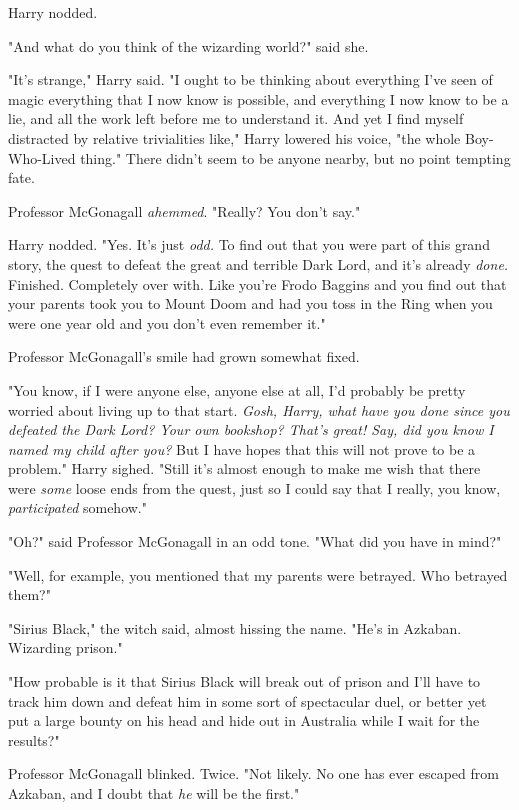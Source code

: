 Harry nodded.

"And what do you think of the wizarding world?" said she.

"It's strange," Harry said. "I ought to be thinking about everything I've seen
of magic{\el} everything that I now know is possible, and everything I now
know to be a lie, and all the work left before me to understand it. And yet I
find myself distracted by relative trivialities like," Harry lowered his voice,
"the whole Boy-Who-Lived thing." There didn't seem to be anyone nearby, but no
point tempting fate.

Professor McGonagall \emph{ahemmed}. "Really? You don't say."

Harry nodded. "Yes. It's just{\el} \emph{odd.} To find out that you were
part of this grand story, the quest to defeat the great and terrible Dark Lord,
and it's already \emph{done.} Finished. Completely over with. Like you're Frodo
Baggins and you find out that your parents took you to Mount Doom and had you
toss in the Ring when you were one year old and you don't even remember it."

Professor McGonagall's smile had grown somewhat fixed.

"You know, if I were anyone else, anyone else at all, I'd probably be pretty
worried about living up to that start. \emph{Gosh, Harry, what have you done
since you defeated the Dark Lord? Your own bookshop? That's great! Say, did you
know I named my child after you?} But I have hopes that this will not prove to
be a problem." Harry sighed. "Still{\el} it's almost enough to make me wish
that there were \emph{some} loose ends from the quest, just so I could say that
I really, you know, \emph{participated} somehow."

"Oh?" said Professor McGonagall in an odd tone. "What did you have in mind?"

"Well, for example, you mentioned that my parents were betrayed. Who betrayed
them?"

"Sirius Black," the witch said, almost hissing the name. "He's in Azkaban.
Wizarding prison."

"How probable is it that Sirius Black will break out of prison and I'll have to
track him down and defeat him in some sort of spectacular duel, or better yet
put a large bounty on his head and hide out in Australia while I wait for the
results?"

Professor McGonagall blinked. Twice. "Not likely. No one has ever escaped from
Azkaban, and I doubt that \emph{he} will be the first."

